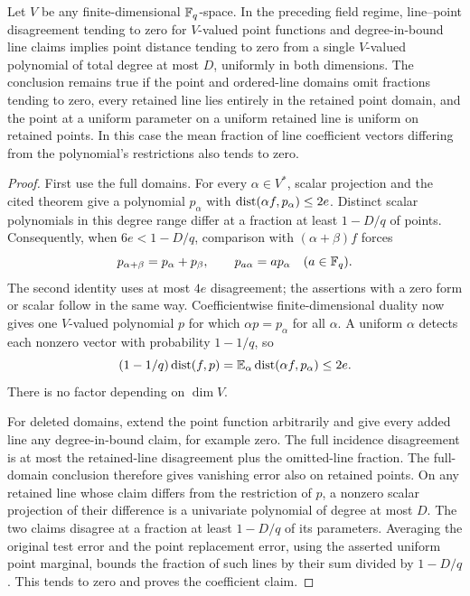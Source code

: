 \begin{lemma}
\label{ib:vector-ld}
Let \(V\) be any finite-dimensional \(\mathbb{F}_q\)-space.  In the preceding
field regime, line--point disagreement tending to zero for
\(V\)-valued point functions and degree-in-bound line claims implies
point distance tending to zero from a single \(V\)-valued polynomial
of total degree at most \(D\), uniformly in both dimensions.
The conclusion remains true if the point and ordered-line domains
omit fractions tending to zero, every retained line lies entirely in
the retained point domain, and the point at a uniform parameter on a
uniform retained line is uniform on retained points.  In this case the
mean fraction of line coefficient vectors differing from the
polynomial's restrictions also tends to zero.
\end{lemma}

\begin{proof}
First use the full domains.  For every \(\alpha\in V^*\), scalar
projection and the cited theorem give a polynomial \(p_\alpha\) with
\(\operatorname{dist}(\alpha f,p_\alpha)\le2e\).  Distinct scalar polynomials in
this degree range differ at a fraction at least \(1-D/q\) of points.
Consequently, when \(6e<1-D/q\), comparison with
\((\alpha+\beta)f\) forces
\[
 p_{\alpha+\beta}=p_\alpha+p_\beta,
 \qquad p_{a\alpha}=a p_\alpha \quad(a\in\mathbb{F}_q).
\]
The second identity uses at most \(4e\) disagreement; the assertions
with a zero form or scalar follow in the same way.  Coefficientwise
finite-dimensional duality now gives one \(V\)-valued polynomial
\(p\) for which \(\alpha p=p_\alpha\) for all \(\alpha\).
A uniform \(\alpha\) detects each nonzero vector with probability
\(1-1/q\), so
\[
 (1-1/q)\operatorname{dist}(f,p)
 =\mathbb{E}_\alpha\operatorname{dist}(\alpha f,p_\alpha)\le2e.
\]
There is no factor depending on \(\dim V\).

For deleted domains, extend the point function arbitrarily and give
every added line any degree-in-bound claim, for example zero.  The
full incidence disagreement is at most the retained-line disagreement
plus the omitted-line fraction.  The full-domain conclusion therefore
gives vanishing error also on retained points.  On any retained line
whose claim differs from the restriction of \(p\), a nonzero scalar
projection of their difference is a univariate polynomial of degree
at most \(D\).  The two claims disagree at a fraction at least
\(1-D/q\) of its parameters.  Averaging the original test error and
the point replacement error, using the asserted uniform point
marginal, bounds the fraction of such lines by their sum divided by
\(1-D/q\).  This tends to zero and proves the coefficient claim.
\end{proof}

